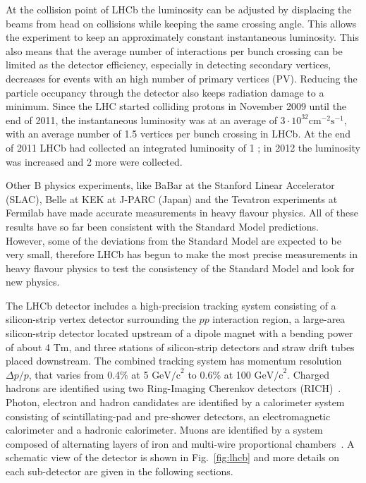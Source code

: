 At the collision point of LHCb the luminosity can be adjusted by displacing the beams from head on collisions
while keeping the same crossing angle. This allows the experiment to keep an approximately constant instantaneous
luminosity. This also means that the average number of interactions per bunch crossing can be limited as the detector
efficiency, especially in detecting secondary vertices, decreases for events with an high number of primary vertices (PV).
Reducing the particle occupancy through the detector also keeps radiation damage to a minimum. Since the LHC started colliding
protons in November 2009 until the end of 2011, the instantaneous luminosity was at an average of
$3 \cdot 10^{32} \mbox{cm}^{-2}\mbox{s}^{-1}$, with an average number of 1.5 vertices per bunch crossing in LHCb.
At the end of 2011 LHCb had collected an integrated luminosity of 1 \invfb; in 2012 the luminosity was increased
and 2 \invfb more were collected.

Other B physics experiments, like BaBar at the Stanford Linear Accelerator (SLAC), Belle at KEK at J-PARC (Japan)
and the Tevatron experiments at Fermilab have made accurate measurements in heavy flavour physics. All of these
results have so far been consistent with the Standard Model predictions. However, some of the deviations from the
Standard Model are expected to be very small, therefore LHCb has begun to make the most precise measurements
in heavy flavour physics to test the consistency of the Standard Model and look for new physics.

The LHCb detector includes a high-precision tracking system consisting of a silicon-strip
vertex detector surrounding the $pp$ interaction region, a large-area silicon-strip detector located upstream
of a dipole magnet with a bending power of about 4 Tm, and three stations of silicon-strip detectors and straw
drift tubes placed downstream. The combined tracking system has momentum resolution $\Delta p/p$, that varies
from 0.4\% at 5 $\mbox{GeV/c}^{2}$ to 0.6\% at 100 $\mbox{GeV/c}^{2}$. Charged hadrons are identified using two
Ring-Imaging Cherenkov detectors (RICH)~\cite{LHCb-DP-2012-003}. Photon, electron and hadron candidates are
identified by a calorimeter system consisting of scintillating-pad and pre-shower detectors, an electromagnetic
calorimeter and a hadronic calorimeter. Muons are identified by a system composed of alternating layers of iron
and multi-wire proportional chambers~\cite{LHCb-DP-2012-002}. A schematic view of the detector is shown in Fig.~\ref{fig:lhcb}
and more details on each sub-detector are given in the following sections.

